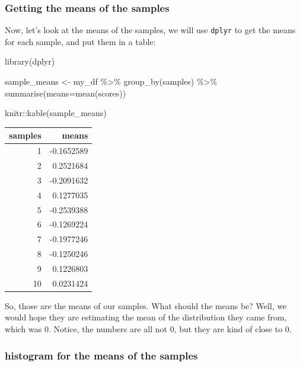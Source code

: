 \documentclass[
]{book}
\newenvironment{Shaded}{\begin{snugshade}}{\end{snugshade}}
\newcommand{\AttributeTok}[1]{\textcolor[rgb]{0.77,0.63,0.00}{#1}}
\newcommand{\FunctionTok}[1]{\textcolor[rgb]{0.00,0.00,0.00}{#1}}
\newcommand{\NormalTok}[1]{#1}
\newcommand{\OtherTok}[1]{\textcolor[rgb]{0.56,0.35,0.01}{#1}}
\newcommand{\SpecialCharTok}[1]{\textcolor[rgb]{0.00,0.00,0.00}{#1}}
\begin{document}
\hypertarget{getting-the-means-of-the-samples}{%
\subsubsection{Getting the means of the samples}\label{getting-the-means-of-the-samples}}

Now, let's look at the means of the samples, we will use \texttt{dplyr} to get the means for each sample, and put them in a table:

\begin{Shaded}
\begin{Highlighting}[]
\FunctionTok{library}\NormalTok{(dplyr)}

\NormalTok{sample\_means }\OtherTok{\textless{}{-}}\NormalTok{ my\_df }\SpecialCharTok{\%\textgreater{}\%}
                \FunctionTok{group\_by}\NormalTok{(samples) }\SpecialCharTok{\%\textgreater{}\%}
                \FunctionTok{summarise}\NormalTok{(}\AttributeTok{means=}\FunctionTok{mean}\NormalTok{(scores))}

\NormalTok{knitr}\SpecialCharTok{::}\FunctionTok{kable}\NormalTok{(sample\_means)}
\end{Highlighting}
\end{Shaded}

\begin{tabular}{r|r}
\hline
samples & means\\
\hline
1 & -0.1652589\\
\hline
2 & 0.2521684\\
\hline
3 & -0.2091632\\
\hline
4 & 0.1277035\\
\hline
5 & -0.2539388\\
\hline
6 & -0.1269224\\
\hline
7 & -0.1977246\\
\hline
8 & -0.1250246\\
\hline
9 & 0.1226803\\
\hline
10 & 0.0231424\\
\hline
\end{tabular}

So, those are the means of our samples. What should the means be? Well, we would hope they are estimating the mean of the distribution they came from, which was 0. Notice, the numbers are all not 0, but they are kind of close to 0.

\hypertarget{histogram-for-the-means-of-the-samples}{%
\subsubsection{histogram for the means of the samples}\label{histogram-for-the-means-of-the-samples}}
\end{document}
